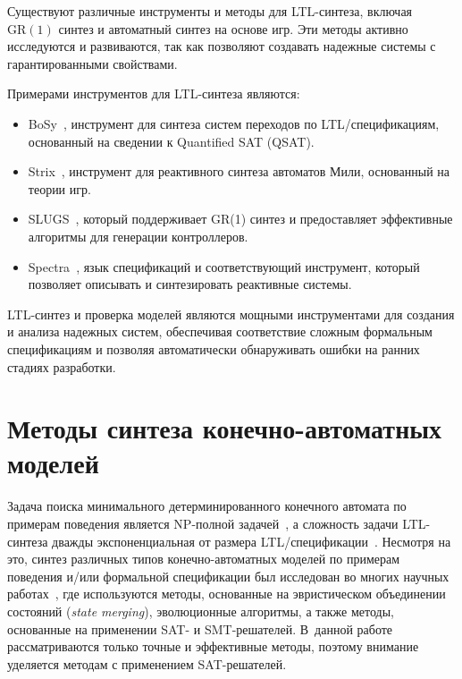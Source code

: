 Существуют различные инструменты и методы для LTL-синтеза, включая $\mathrm{GR}(1)$ синтез и автоматный синтез на основе игр.
Эти методы активно исследуются и развиваются, так как позволяют создавать надежные системы с гарантированными свойствами.

Примерами инструментов для LTL-синтеза являются:
\begin{itemize}
    \item BoSy~\cite{bosy,not-bosy}, инструмент для синтеза систем переходов по LTL\-/спецификациям, основанный на сведении к Quantified SAT (QSAT).
    \item Strix~\cite{strix}, инструмент для реактивного синтеза автоматов Мили, основанный на теории игр.
    \item SLUGS~\cite{ehlers2016}, который поддерживает GR(1) синтез и предоставляет эффективные алгоритмы для генерации контроллеров.
    \item Spectra~\cite{maoz2021}, язык спецификаций и соответствующий инструмент, который позволяет описывать и синтезировать реактивные системы.
\end{itemize}

LTL-синтез и проверка моделей являются мощными инструментами для создания и анализа надежных систем, обеспечивая соответствие сложным формальным спецификациям и позволяя автоматически обнаруживать ошибки на ранних стадиях разработки.


\section{Методы синтеза конечно-автоматных моделей}
\label{sec:automata-synthesis-overview}


Задача поиска минимального детерминированного конечного автомата по примерам поведения является NP-полной задачей~\cite{gold}, а сложность задачи LTL-синтеза дважды экспоненциальная от размера LTL\-/спецификации~\cite{rosner-phd}.
Несмотря на это, синтез различных типов конечно-автоматных моделей по примерам поведения и/или формальной спецификации был исследован во многих научных работах~\cite{heule2010,efsm-tools,zakirzyanov2019,buzhinsky-tii,bosy,tsarev-egorov-gecco,giantamidis-tripakis,petrenko,petrenko2,neider,g4ltl-st,smetsers-lata}, где используются методы, основанные на эвристическом объединении состояний (\textit{state merging}), эволюционные алгоритмы, а также методы, основанные на применении SAT- и SMT-решателей.
В~данной работе рассматриваются только точные и эффективные методы, поэтому внимание уделяется методам с применением SAT-решателей.

